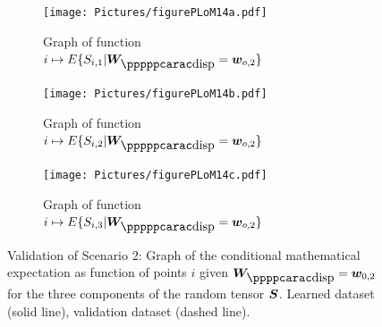 %
\begin{figure}[!htb]
    \centering
    \begin{subfigure}[b]{0.33\textwidth}
    \centering
        \texttt{[image: Pictures/figurePLoM14a.pdf]}
        \caption{Graph of function $i\mapsto E\{ S_{i,1} \vert \bfW_\disppp = \bfw_{o,2} \}$}
        \label{fig:figurePLoM14a}
    \end{subfigure}
    \centering
    \begin{subfigure}[b]{0.33\textwidth}
    \centering
        \texttt{[image: Pictures/figurePLoM14b.pdf]}
        \caption{Graph of function $i\mapsto E\{ S_{i,2} \vert \bfW_\disppp = \bfw_{o,2} \}$}
        \label{fig:figurePLoM14b}
    \end{subfigure}
    \centering
    \begin{subfigure}[b]{0.33\textwidth}
    \centering
        \texttt{[image: Pictures/figurePLoM14c.pdf]}
        \caption{Graph of function $i\mapsto E\{ S_{i,3} \vert \bfW_\disppp = \bfw_{o,2} \}$}
        \label{fig:figurePLoM14c}
    \end{subfigure}
    \caption{Validation of Scenario 2: Graph of the conditional mathematical expectation as function of points $i$ given $\bfW_\dispp =\bfw_{0,2}$ for the three components of the random tensor ${\boldsymbol{S}}$.  Learned dataset (solid line), validation dataset (dashed line).}
    \label{fig:figurePLoM14}
\end{figure}